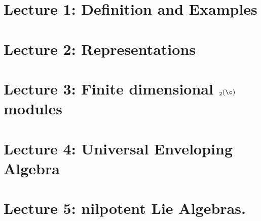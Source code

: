 \documentclass{article}
\begin{document}
\chapter{Lecture 1: Definition and Examples}
\chapter{Lecture 2: Representations}
\chapter{Lecture 3: Finite dimensional $\sl_2(\c)$ modules}
\chapter{Lecture 4: Universal Enveloping Algebra}
\chapter{Lecture 5: nilpotent Lie Algebras.}
\end{document}
